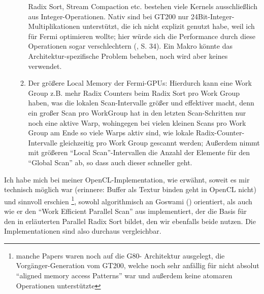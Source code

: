 \begin{enumerate}
\begin{enumerate}
			Radix Sort, Stream Compaction etc. bestehen viele Kernels ausschließlich aus Integer-Operationen.
			Nativ sind bei GT200 nur 24Bit-Integer-Multiplikationen unterstützt, die ich nicht explizit genutzt habe, weil 
			ich für Fermi optimieren wollte; hier würde sich die Performance durch diese Operationen sogar 
			verschlechtern (\cite{nvidiaOpenCLProgrammingGuide}, S. 34). Ein Makro könnte das 
			Architektur-spezifische Problem beheben, noch wird aber keines verwendet.
			\item Der größere Local Memory der Fermi-GPUs:
				Hierdurch kann eine Work Group z.B. mehr Radix Counters beim Radix Sort pro Work Group haben, 
				was die lokalen Scan-Intervalle größer und effektiver macht, denn ein großer Scan pro WorkGroup 
				hat in den letzten Scan-Schritten nur noch eine aktive Warp, wohingegen bei vielen kleinen Scans pro Work 					Group am Ende so viele Warps aktiv sind, wie lokale Radix-Counter-Intervalle gleichzeitig pro Work Group 	
				gescannt werden; Außerdem nimmt mit größeren "`Local Scan"'-Intervallen die Anzahl der Elemente für den
				"`Global Scan"' ab, so dass auch dieser schneller geht.
			\end{enumerate}	
	\end{enumerate}
	
	
	
	
	
	
	Ich habe mich bei meiner OpenCL-Implementation, wie erwähnt, soweit es mir technisch möglich war (erinnere: Buffer als
	Textur binden geht in OpenCL nicht) und sinnvoll erschien
	\footnote{manche Papers waren noch auf die G80- Architektur
		ausgelegt, die Vorgänger-Generation vom GT200, welche noch sehr anfällig für nicht absolut 
		"`aligned memory access Patterns"' war und außerdem keine atomaren Operationen unterstützte},
	sowohl algorithmisch an Goswami (\cite{Goswami2010}) orientiert, als auch wie er den 
	"`Work Efficient Parallel Scan"' aus \cite{Harris2007} implementiert, der die Basis für den in \cite{Grand2008} 
	erläuterten Parallel Radix Sort bildet, den wir ebenfalls beide nutzen.
	Die Implementationen sind also durchaus vergleichbar.
	
